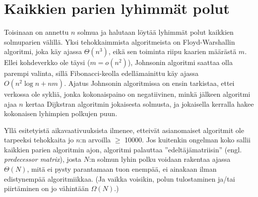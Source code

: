 \documentclass[finnish]{tktltiki2}
\theoremstyle{definition}
\theoremstyle{remark}
\begin{document}
\section{Kaikkien parien lyhimmät polut}
Toisinaan on annettu $n$ solmua ja halutaan löytää lyhimmät polut kaikkien solmuparien välillä. Yksi tehokkaimmista algoritmeista on Floyd-Warshallin algoritmi, joka käy ajassa $\Theta(n^3)$, eikä sen toiminta riipu kaarien määrästä $m$. Ellei kohdeverkko ole täysi ($m = o(n^2)$), Johnsonin algoritmi saattaa olla parempi valinta, sillä Fibonacci-keolla edellämainittu käy ajassa $O(n^2 \log n + nm)$. Ajatus Johnsonin algoritmissa on ensin tarkistaa, ettei verkossa ole sykliä, jonka kokonaispaino on negatiivinen, minkä jälkeen algoritmi ajaa $n$ kertaa Dijkstran algoritmin jokaisesta solmusta, ja jokaisella kerralla hakee kokonaisen lyhimpien polkujen puun. 

Yllä esitetyistä aikavaativuuksista ilmenee, etteivät asianomaiset algoritmit ole tarpeeksi tehokkaita jo $n$:n arvoilla $\geq$ 10000. Jos kuitenkin ongelman koko sallii kaikkien parien algoritmin ajon, algoritmi palauttaa ''edeltäjämatriisin'' (engl. \textit{predecessor matrix}), josta $N$:n solmun lyhin polku voidaan rakentaa ajassa $\Theta(N)$, mitä ei pysty parantamaan tuon enempää, ei ainakaan ilman edistynempää algoritmiikkaa. (Ja vaikka voisikin, polun tulostaminen ja/tai piirtäminen on jo vähintään $\Omega(N)$.)
\end{document}
